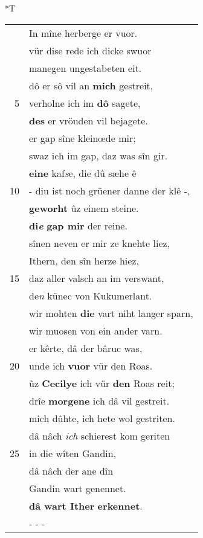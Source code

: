 \documentclass[8pt,a4paper,notitlepage]{article}
\begin{document}
\begin{table}[ht]
\begin{minipage}[t]{0.5\linewidth}
\small
\begin{center}*T
\end{center}
\begin{tabular}{rl}
 & In mîne herberge er vuor.\\ 
 & vür dise rede ich dicke swuor\\ 
 & manegen ungestabeten eit.\\ 
 & dô er sô vil an \textbf{mich} gestreit,\\ 
5 & verholne ich im \textbf{dô} sagete,\\ 
 & \textbf{des} er vröuden vil bejagete.\\ 
 & er gap sîne kleinœde mir;\\ 
 & swaz ich im gap, daz was sîn gir.\\ 
 & \textbf{eine} kaf\textit{s}e, die dû sæhe ê\\ 
10 & - diu ist noch grüener danne der klê -,\\ 
 & \textbf{geworht} ûz einem steine.\\ 
 & \textbf{di\textit{e}} \textbf{gap mir} der reine.\\ 
 & sînen neven er mir ze knehte liez,\\ 
 & Ithern, den sîn herze hiez,\\ 
15 & daz aller valsch an im verswant,\\ 
 & de\textit{n} künec von Kukumerlant.\\ 
 & wir mohten \textbf{die} vart niht langer sparn,\\ 
 & wir muosen von ein ander varn.\\ 
 & er kêrte, dâ der bâruc was,\\ 
20 & unde ich \textbf{vuor} vür den Roas.\\ 
 & ûz \textbf{Cecilye} ich vür \textbf{den} Roas reit;\\ 
 & drîe \textbf{morgene} ich dâ vil gestreit.\\ 
 & mich dûhte, ich hete wol gestriten.\\ 
 & dâ nâch \textit{ich} schierest kom geriten\\ 
25 & in die wîten Gandin,\\ 
 & dâ nâch der ane dîn\\ 
 & Gandin wart genennet.\\ 
 & \textbf{dâ wart Ither} \textbf{erkennet}.\\ 
 & \multicolumn{1}{l}{ - - - }\\ 

\end{tabular}
\end{minipage}
\end{table}
\end{document}
